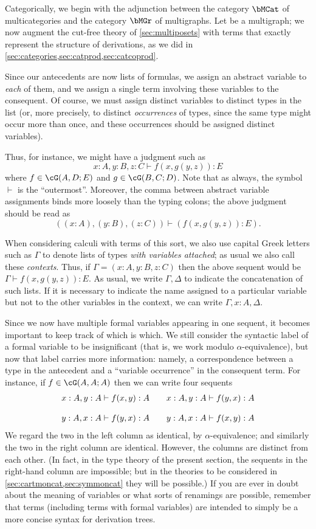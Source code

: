 \documentclass{book}
\let\types\vdash
\begin{document}
Categorically, we begin with the adjunction between the category $\bMCat$ of multicategories and the category $\bMGr$ of multigraphs.
Let \cG be a multigraph; we now augment the cut-free theory of \cref{sec:multiposets} with terms that exactly represent the structure of derivations, as we did in \cref{sec:categories,sec:catprod,sec:catcoprod}.

Since our antecedents are now lists of formulas, we assign an abstract variable to \emph{each} of them, and we assign a single term involving these variables to the consequent.
Of course, we must assign distinct variables to distinct types in the list (or, more precisely, to distinct \emph{occurrences} of types, since the same type might occur more than once, and these occurrences should be assigned distinct variables).

Thus, for instance, we might have a judgment such as
\[ x:A, y:B, z:C \types f(x,g(y,z)):E \]
where $f\in\cG(A,D;E)$ and $g\in\cG(B,C;D)$.
Note that as always, the symbol $\types$ is the ``outermost''.
Moreover, the comma between abstract variable assignments binds more loosely than the typing colons; the above judgment should be read as
\[ ((x:A), (y:B), (z:C)) \types (f(x,g(y,z)):E). \]

When considering calculi with terms of this sort, we also use capital Greek letters such as $\Gamma$ to denote lists of types \emph{with variables attached}; as usual we also call these \emph{contexts}.
Thus, if $\Gamma = (x:A, y:B, z:C)$ then the above sequent would be $\Gamma\types f(x,g(y,z)):E$.
As usual, we write $\Gamma,\Delta$ to indicate the concatenation of such lists.
If it is necessary to indicate the name assigned to a particular variable but not to the other variables in the context, we can write $\Gamma, x:A, \Delta$.

Since we now have multiple formal variables appearing in one sequent, it becomes important to keep track of which is which.
We still consider the syntactic label of a formal variable to be insignificant (that is, we work modulo $\alpha$-equivalence), but now that label carries more information: namely, a correspondence between a type in the antecedent and a ``variable occurrence'' in the consequent term.
For instance, if $f\in\cG(A,A;A)$ then we can write four sequents
\[
\begin{array}{c@{\qquad}c}
  x:A, y:A \types f(x,y):A &
  x:A, y:A \types f(y,x):A \\\\
  y:A, x:A \types f(y,x):A &
  y:A, x:A \types f(x,y):A
\end{array}
\]
We regard the two in the left column as identical, by $\alpha$-equivalence; and similarly the two in the right column are identical.
However, the columns are distinct from each other.
(In fact, in the type theory of the present section, the sequents in the right-hand column are impossible; but in the theories to be considered in \cref{sec:cartmoncat,sec:symmoncat} they will be possible.)
If you are ever in doubt about the meaning of variables or what sorts of renamings are possible, remember that terms (including terms with formal variables) are intended to simply be a more concise syntax for derivation trees.
\end{document}
